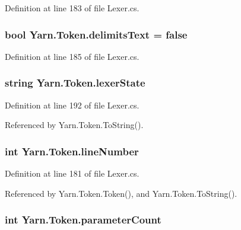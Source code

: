 Definition at line 183 of file Lexer.\-cs.

\hypertarget{a00167_af15d26fa4e6f276ab58ff66d3c4203da}{
\subsubsection[{delimits\-Text}]{\setlength{\rightskip}{0pt plus 5cm}bool Yarn.\-Token.\-delimits\-Text = false}}\label{a00167_af15d26fa4e6f276ab58ff66d3c4203da}


Definition at line 185 of file Lexer.\-cs.

\hypertarget{a00167_a710099e7abe84f30864a320cc7464214}{
\subsubsection[{lexer\-State}]{\setlength{\rightskip}{0pt plus 5cm}string Yarn.\-Token.\-lexer\-State}}\label{a00167_a710099e7abe84f30864a320cc7464214}


Definition at line 192 of file Lexer.\-cs.



Referenced by Yarn.\-Token.\-To\-String().

\hypertarget{a00167_a80fe710713201bb793a41452e314a721}{
\subsubsection[{line\-Number}]{\setlength{\rightskip}{0pt plus 5cm}int Yarn.\-Token.\-line\-Number}}\label{a00167_a80fe710713201bb793a41452e314a721}


Definition at line 181 of file Lexer.\-cs.



Referenced by Yarn.\-Token.\-Token(), and Yarn.\-Token.\-To\-String().

\hypertarget{a00167_adf11c0d29b66935a8d8109d6308d0488}{
\subsubsection[{parameter\-Count}]{\setlength{\rightskip}{0pt plus 5cm}int Yarn.\-Token.\-parameter\-Count}}\label{a00167_adf11c0d29b66935a8d8109d6308d0488}


